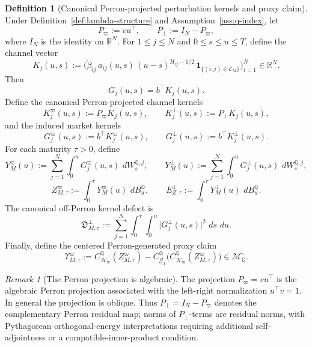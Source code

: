 \documentclass[11pt,a4paper]{amsart}
\theoremstyle{plain}
\theoremstyle{definition}
\newtheorem{definition}[theorem]{Definition}
\theoremstyle{remark}
\newtheorem{remark}[theorem]{Remark}
\newcommand{\R}{\mathbb{R}}
\newcommand{\QQ}{\mathbb{Q}}
\newcommand{\cG}{\mathcal{G}}
\newcommand{\cH}{\mathcal{H}}
\newcommand{\cE}{\mathcal{E}}
\newcommand{\cM}{\mathcal{M}}
\newcommand{\one}{\mathbf{1}}
\newcommand{\dd}{\,d}
\begin{document}
\begin{definition}[Canonical Perron-projected perturbation kernels and proxy claim]\label{def:gaussian-perron-proxy}
Under Definition~\ref{def:lambda-structure} and Assumption~\ref{ass:q-index}, let
\[
        P_\varpi:=vu^\top,
        \qquad
        P_\perp:=I_N-P_\varpi,
\]
where \(I_N\) is the identity on \(\R^N\).  For \(1\le j\le N\) and \(0\le s\le u\le T\), define
the channel vector
\[
        K_j(u,s)
        :=
        \bigl(
                \dot\beta_{ij}\,a_{ij}(u,s)\,(u-s)^{H_{ij}-1/2}\,
                \one_{\{(i,j)\in\cE_M\}}
        \bigr)_{i=1}^N
        \in\R^N.
\]
Then
\[
        G_j(u,s)=b^\top K_j(u,s).
\]
Define the canonical Perron-projected channel kernels
\[
        K_j^\varpi(u,s):=P_\varpi K_j(u,s),
        \qquad
        K_j^\perp(u,s):=P_\perp K_j(u,s),
\]
and the induced market kernels
\[
        G_j^\varpi(u,s):=b^\top K_j^\varpi(u,s),
        \qquad
        G_j^\perp(u,s):=b^\top K_j^\perp(u,s).
\]
For each maturity \(\tau>0\), define
\[
        Y_M^\varpi(u)
        :=
        \sum_{j=1}^N \int_0^u G_j^\varpi(u,s)\,\dd W_s^{\QQ,j},
        \qquad
        Y_M^\perp(u)
        :=
        \sum_{j=1}^N \int_0^u G_j^\perp(u,s)\,\dd W_s^{\QQ,j},
\]
\[
        Z_{M,\tau}^\varpi
        :=
        \int_0^\tau Y_M^\varpi(u)\,\dd B_u^\QQ,
        \qquad
        E_{Z,\tau}^\perp
        :=
        \int_0^\tau Y_M^\perp(u)\,\dd B_u^\QQ.
\]
The canonical off-Perron kernel defect is
\[
        \mathfrak D_{M,\tau}^\perp
        :=
        \sum_{j=1}^N \int_0^\tau \int_0^u
        \bigl|G_j^\perp(u,s)\bigr|^2\,\dd s\,\dd u.
\]
Finally, define the centered Perron-generated proxy claim
\[
        \Upsilon_{M,\tau}^\varpi
        :=
        C_{\cH_\varpi}^\QQ(Z_{M,\tau}^\varpi)
        -
        C_{\cG_T}^\QQ\bigl(C_{\cH_\varpi}^\QQ(Z_{M,\tau}^\varpi)\bigr)
        \in\cM_\QQ^\circ.
\]
\end{definition}

\begin{remark}[The Perron projection is algebraic]
The projection \(P_\varpi=vu^\top\) is the algebraic Perron projection associated with the
left-right normalization \(u^\top v=1\).  In general the projection is oblique.  Thus
\(P_\perp=I_N-P_\varpi\) denotes the complementary Perron residual map; norms of
\(P_\perp\)-terms are residual norms, with Pythagorean orthogonal-energy interpretations requiring
additional self-adjointness or a compatible-inner-product condition.
\end{remark}
\end{document}
